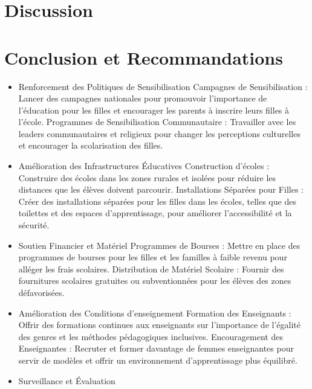 \documentclass[a4paper,12pt]{report}
\begin{document}
\chapter*{Discussion}


\chapter*{Conclusion et Recommandations}
\begin{itemize}{}

\item Renforcement des Politiques de Sensibilisation
Campagnes de Sensibilisation : Lancer des campagnes nationales pour promouvoir l'importance de l'éducation pour les filles et encourager les parents à inscrire leurs filles à l'école.
Programmes de Sensibilisation Communautaire : Travailler avec les leaders communautaires et religieux pour changer les perceptions culturelles et encourager la scolarisation des filles.\\
\item Amélioration des Infrastructures Éducatives
Construction d'écoles : Construire des écoles dans les zones rurales et isolées pour réduire les distances que les élèves doivent parcourir.
Installations Séparées pour Filles : Créer des installations séparées pour les filles dans les écoles, telles que des toilettes et des espaces d'apprentissage, pour améliorer l'accessibilité et la sécurité.\\
\item Soutien Financier et Matériel
Programmes de Bourses : Mettre en place des programmes de bourses pour les filles et les familles à faible revenu pour alléger les frais scolaires.
Distribution de Matériel Scolaire : Fournir des fournitures scolaires gratuites ou subventionnées pour les élèves des zones défavorisées.\\
\item Amélioration des Conditions d'enseignement
Formation des Enseignants : Offrir des formations continues aux enseignants sur l'importance de l'égalité des genres et les méthodes pédagogiques inclusives.
Encouragement des Enseignantes : Recruter et former davantage de femmes enseignantes pour servir de modèles et offrir un environnement d'apprentissage plus équilibré.\\
\item Surveillance et Évaluation

\end{itemize}
\end{document}
